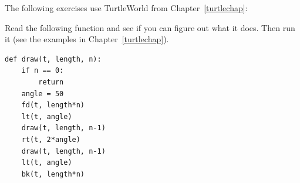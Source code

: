 \documentclass[10pt]{book}
\begin{document}
The following exercises use TurtleWorld from Chapter~\ref{turtlechap}:


\begin{ex}

Read the following function and see if you can figure out
what it does.  Then run it (see the examples in Chapter~\ref{turtlechap}).

\beforeverb
\begin{verbatim}
def draw(t, length, n):
    if n == 0:
        return
    angle = 50
    fd(t, length*n)
    lt(t, angle)
    draw(t, length, n-1)
    rt(t, 2*angle)
    draw(t, length, n-1)
    lt(t, angle)
    bk(t, length*n)
\end{verbatim}
\afterverb

\end{ex}
\end{document}

